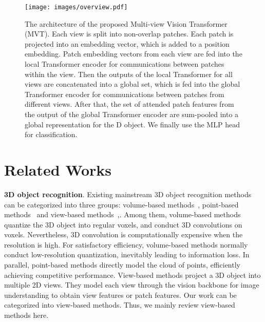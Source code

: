 \documentclass{bmvc2k}
\begin{document}
\begin{figure}
     \centering
    \texttt{[image: images/overview.pdf]}
     \caption{
    The architecture of the proposed Multi-view Vision Transformer (MVT). Each view is split into non-overlap patches. Each patch is projected into an embedding vector,  which is added to a position embedding.   Patch embedding vectors from each view are fed into the local Transformer encoder for communications between patches within the view. Then the outputs of the local Transformer for all views are concatenated into a global set, which is fed into the global Transformer encoder for communications between patches from different views.  After that, the set of attended patch features from the output of the global Transformer encoder are sum-pooled into a global representation for the D object.  We finally use the MLP head for classification.
     }
     \label{fig:overview}
\end{figure}

\section{Related Works}
\textbf{3D object recognition}. Existing mainstream 3D object recognition methods can be categorized into three groups:  volume-based methods~\cite{wu20153d,maturana2015voxnet,qi2016volumetric,meng2019vv}, point-based methods~\cite{pointnet,pointnet++,3Dmfv} and view-based methods~\cite{wang2017dominant,feng2018gvcnn,kanezaki2018rotationnet,DBLP:journals/tip/HanSLVLZHC19,DBLP:journals/tip/HanLLVLZHC19,Wei_2020_CVPR},. Among them, volume-based methods quantize the 3D object into regular voxels, and conduct  3D convolutions on voxels. Nevertheless, 3D convolution is computationally expensive when the resolution is high. For satisfactory efficiency,  volume-based methods  normally conduct low-resolution quantization, inevitably leading to information loss.
In parallel, point-based methods directly model the cloud of points, efficiently achieving competitive performance. View-based methods project a 3D object into multiple 2D views. They model each view through the vision backbone for image understanding to obtain view features or patch features. Our work can be categorized into view-based methods. Thus, we mainly review view-based methods here. 
\end{document}
